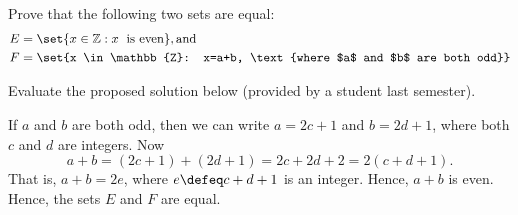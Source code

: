 \documentclass[10pt]{beamer}
\begin{document}
\begin{frame}

 \begin{mygreenbox}[title=Problem]
Prove that the following two sets are equal:
%
\begin{align*}
E &= \set{x \in \mathbb{Z}: x \text{\; is even}}, \text{and} \\
F &= \set{x \in \mathbb{Z}: x=a+b, \text{where $a$ and $b$ are both odd}}
\end{align*}
\end{mygreenbox}

\vfill 
 \begin{myyellowbox}[title=Puzzle]
Evaluate the proposed solution below (provided by a student last semester). 
\end{myyellowbox}

\vfill 
 \begin{myredbox}[title=Proposed Solution]
If $a$ and $b$ are both odd, then we can write $a=2c+1$ and $b=2d+1$, where both $c$ and $d$ are integers.  Now 
\[ a+b = (2c+1) + (2d+1) = 2c+2d+2 = 2(c+d+1).\]
That is, $a+b=2e$, where $e \defeq c+d+1$ is an integer.  Hence, $a+b$ is even.  Hence,  the sets $E$ and $F$ are equal. 
\end{myredbox}
\end{frame}
\end{document}
